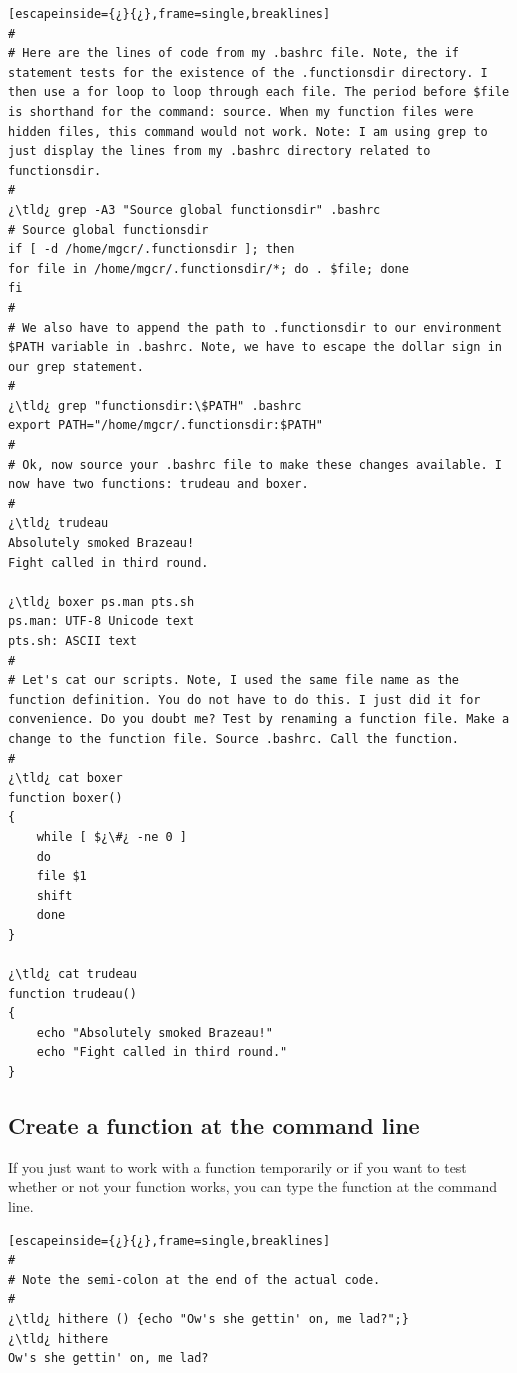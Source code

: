 \begin{lstlisting}[escapeinside={¿}{¿},frame=single,breaklines]
#
# Here are the lines of code from my .bashrc file. Note, the if statement tests for the existence of the .functionsdir directory. I then use a for loop to loop through each file. The period before $file is shorthand for the command: source. When my function files were hidden files, this command would not work. Note: I am using grep to just display the lines from my .bashrc directory related to functionsdir.
#
¿\tld¿ grep -A3 "Source global functionsdir" .bashrc
# Source global functionsdir
if [ -d /home/mgcr/.functionsdir ]; then
for file in /home/mgcr/.functionsdir/*; do . $file; done
fi
#
# We also have to append the path to .functionsdir to our environment $PATH variable in .bashrc. Note, we have to escape the dollar sign in our grep statement.
#
¿\tld¿ grep "functionsdir:\$PATH" .bashrc
export PATH="/home/mgcr/.functionsdir:$PATH"
#
# Ok, now source your .bashrc file to make these changes available. I now have two functions: trudeau and boxer.
#
¿\tld¿ trudeau
Absolutely smoked Brazeau!
Fight called in third round.

¿\tld¿ boxer ps.man pts.sh
ps.man: UTF-8 Unicode text
pts.sh: ASCII text
#
# Let's cat our scripts. Note, I used the same file name as the function definition. You do not have to do this. I just did it for convenience. Do you doubt me? Test by renaming a function file. Make a change to the function file. Source .bashrc. Call the function.
#
¿\tld¿ cat boxer
function boxer()
{
	while [ $¿\#¿ -ne 0 ]
	do
	file $1
	shift
	done
}

¿\tld¿ cat trudeau
function trudeau()
{
	echo "Absolutely smoked Brazeau!"
	echo "Fight called in third round."
}
\end{lstlisting}

\subsection{Create a function at the command line}

If you just want to work with a function temporarily or if you want to test whether or not your function works, you can type the function at the command line.

\begin{lstlisting}[escapeinside={¿}{¿},frame=single,breaklines]
#
# Note the semi-colon at the end of the actual code.
#
¿\tld¿ hithere () {echo "Ow's she gettin' on, me lad?";}
¿\tld¿ hithere
Ow's she gettin' on, me lad?
\end{lstlisting}

